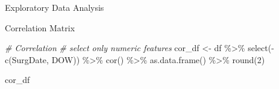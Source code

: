 \documentclass[
  ignorenonframetext,
]{beamer}
\newenvironment{Shaded}{\begin{snugshade}}{\end{snugshade}}
\newcommand{\CommentTok}[1]{\textcolor[rgb]{0.56,0.35,0.01}{\textit{#1}}}
\newcommand{\DecValTok}[1]{\textcolor[rgb]{0.00,0.00,0.81}{#1}}
\newcommand{\FunctionTok}[1]{\textcolor[rgb]{0.00,0.00,0.00}{#1}}
\newcommand{\NormalTok}[1]{#1}
\newcommand{\OtherTok}[1]{\textcolor[rgb]{0.56,0.35,0.01}{#1}}
\newcommand{\SpecialCharTok}[1]{\textcolor[rgb]{0.00,0.00,0.00}{#1}}
\begin{document}
\begin{frame}[fragile]{Exploratory Data Analysis}
\begin{block}{Correlation Matrix}
\protect\hypertarget{correlation-matrix}{}
\begin{Shaded}
\begin{Highlighting}[]
\CommentTok{\# Correlation}
\CommentTok{\# select only numeric features}
\NormalTok{cor\_df }\OtherTok{\textless{}{-}}\NormalTok{ df }\SpecialCharTok{\%\textgreater{}\%} 
        \FunctionTok{select}\NormalTok{(}\SpecialCharTok{{-}}\FunctionTok{c}\NormalTok{(SurgDate, DOW)) }\SpecialCharTok{\%\textgreater{}\%} 
        \FunctionTok{cor}\NormalTok{() }\SpecialCharTok{\%\textgreater{}\%} 
        \FunctionTok{as.data.frame}\NormalTok{() }\SpecialCharTok{\%\textgreater{}\%} 
        \FunctionTok{round}\NormalTok{(}\DecValTok{2}\NormalTok{)}

\NormalTok{cor\_df}
\end{Highlighting}
\end{Shaded}


\end{block}
\end{frame}
\end{document}
